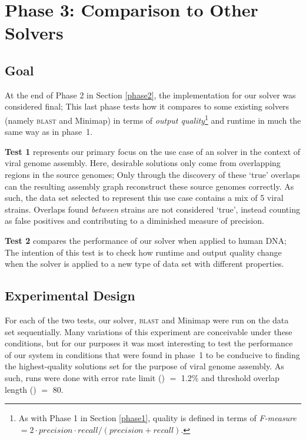 \section{Phase 3: Comparison to Other Solvers}
\label{phase3}

\subsection{Goal}
At the end of Phase 2 in Section \ref{phase2}, the implementation for our \aspop{} solver was considered final; This last phase tests how it compares to some existing solvers (namely \textsc{blast} and Minimap) in terms of \textit{output quality}\footnote{As with Phase 1 in Section \ref{phase1}, quality is defined in terms of \textit{F-measure} $=  2\cdot{}precision\cdot{}recall/(precision+recall)$.} and runtime in much the same way as in phase~1.

\textbf{Test 1} represents our primary focus on the use case of an \aspop{} solver in the context of viral genome assembly. Here, desirable \glspl{solution} only come from overlapping regions in the \glspl{source genome}; Only through the discovery of these `true' overlaps can the resulting assembly graph reconstruct these source genomes correctly. As such, the data set selected to represent this use case contains a mix of 5 viral strains. Overlaps found \textit{between} strains are not considered `true', instead counting as false positives and contributing to a diminished measure of precision.

\textbf{Test 2} compares the performance of our \aspop{} solver when applied to human DNA; The intention of this test is to check how runtime and output quality change when the solver is applied to a new type of data set with different properties.

\subsection{Experimental Design}

For each of the two tests, our \aspop{} solver, \textsc{blast} and Minimap were run on the data set sequentially. Many variations of this experiment are conceivable under these conditions, but for our purposes it was most interesting to test the performance of our system in conditions that were found in phase~1 to be conducive to finding the highest-quality solutions set for the purpose of viral genome assembly. As such, runs were done with error rate limit () $=$ 1.2\% and threshold overlap length () $=$ 80.

